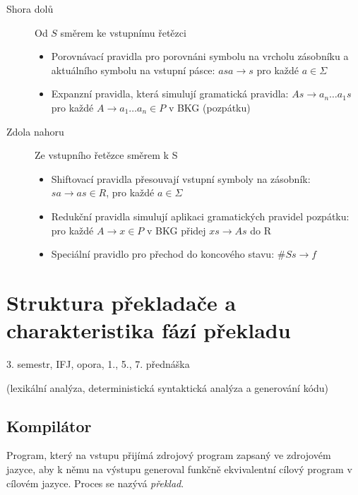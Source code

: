 \documentclass[a4wide]{report}
\begin{document}
\begin{description}
	\item[Shora dolů] Od $S$ směrem ke vstupnímu řetězci
	\begin{itemize}
		\item Porovnávací pravidla pro porovnáni symbolu na vrcholu zásobníku a aktuálního symbolu na vstupní pásce: $asa \to s$ pro každé $a \in \Sigma$
		\item Expanzní pravidla, která simulují gramatická pravidla: $As \to a_n \dots a_1s$ pro každé $A \to a_1 \dots a_n \in P$ v BKG (pozpátku)
	\end{itemize}
	\item[Zdola nahoru] Ze vstupního řetězce směrem k S
	\begin{itemize}
		\item Shiftovací pravidla přesouvají vstupní symboly na zásobník: $sa \to as \in R$, pro každé $a \in \Sigma$
		\item Redukční pravidla simulují aplikaci gramatických pravidel pozpátku: pro každé $A \to x \in P$ v BKG přidej $xs \to As$ do R
		\item Speciální pravidlo pro přechod do koncového stavu: $\#Ss \to f$
	\end{itemize}
\end{description}




























\chapter{Struktura překladače a charakteristika fází překladu} \label{cha:22}

3. semestr, IFJ, opora, 1., 5., 7. přednáška

(lexikální analýza, deterministická syntaktická analýza a generování kódu)


\section{Kompilátor}
Program, který na vstupu přijímá zdrojový program zapsaný ve zdrojovém jazyce, aby k němu na výstupu generoval funkčně ekvivalentní cílový program v cílovém jazyce. Proces se nazývá \emph{překlad}.
\end{document}
